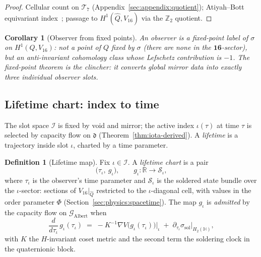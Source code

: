 \documentclass[11pt]{article}
\theoremstyle{plain}
\newtheorem{corollary}[theorem]{Corollary}
\theoremstyle{definition}
\newtheorem{definition}[theorem]{Definition}
\theoremstyle{remark}
\numberwithin{equation}{section}
\newcommand{\Quat}{\mathbb{H}}
\newcommand{\orderparam}{\Phi}
\begin{document}
\begin{proof}
Cellular count on $\mathcal{T}_7$ (Appendix~\ref{sec:appendix:quotient});
Atiyah--Bott equivariant index~\cite{AtiyahBott1966}; passage to
$H^1(\hat Q,V_{16})$ via the $\mathbb{Z}_2$ quotient.
\end{proof}

\begin{corollary}[Observer from fixed points]\label{cor:observer-fp}
An observer is a \emph{fixed-point label} of $\sigma$ on $H^1(Q,V_{16})$:
not a point of $Q$ fixed by $\sigma$ (there are none in the
$\mathbf{16}$-sector), but an anti-invariant cohomology class whose
Lefschetz contribution is $-1$. The fixed-point theorem is the clincher:
it converts global mirror data into exactly three individual observer slots.
\end{corollary}

\subsection{Lifetime chart: index to time}
\label{sec:observer:lifetime}

The slot space $\mathcal{I}$ is fixed by void and mirror; the active index
$\iota(\tau)$ at time $\tau$ is selected by capacity flow on $\mathfrak{d}$
(Theorem~\ref{thm:iota-derived}). A \emph{lifetime} is a trajectory inside
slot $\iota$, charted by a time parameter.

\begin{definition}[Lifetime map]\label{def:lifetime}
Fix $\iota\in\mathcal{I}$. A \emph{lifetime chart} is a pair
\begin{equation}\label{eq:lifetime-chart}
  \bigl(\tau_\iota,\ g_\iota\bigr),
  \qquad
  g_\iota:\mathbb{R}\longrightarrow \mathcal{S}_\iota,
\end{equation}
where $\tau_\iota$ is the observer's time parameter and $\mathcal{S}_\iota$ is
the soldered state bundle over the $\iota$-sector: sections of
$V_{16}|_{\hat Q}$ restricted to the $\iota$-diagonal cell, with values in the
order parameter $\orderparam$ (Section~\ref{sec:physics:spacetime}).
The map $g_\iota$ is \emph{admitted} by the capacity flow on
$\mathcal{G}_{\mathrm{Albert}}$ when
\begin{equation}\label{eq:lifetime-admitted}
  \frac{d}{d\tau_\iota}\, g_\iota(\tau_\iota)
  \;=\;
  -K^{-1}\nabla V\bigl(g_\iota(\tau_\iota)\bigr)\big|_{\iota}
  \;+\;
  \partial_{\tau_\iota}\sigma_{\mathrm{sol}}\big|_{H_2(\Quat)},
\end{equation}
with $K$ the $H$-invariant coset metric and the second term the soldering
clock in the quaternionic block.
\end{definition}
\end{document}
